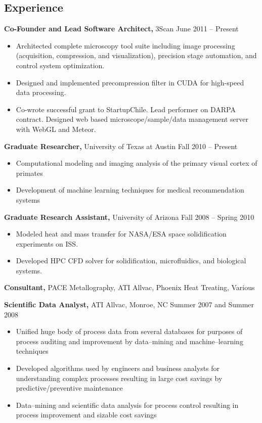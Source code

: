 \documentclass{res}
\begin{document}
\begin{resume}
\section{Experience}
{\bf Co-Founder and Lead Software Architect,} 3Scan \hfill 
June 2011 -- Present
\begin{itemize}  \itemsep -2pt 
\item Architected complete microscopy tool suite including image processing 
  (acquisition, compression, and visualization), 
  precision stage automation, and control system optimization.
\item Designed and implemented precompression filter in CUDA for high-speed data processing. 
\item Co-wrote successful grant to StartupChile.  Lead performer on
  DARPA contract.   Designed web based microscope/sample/data management server with WebGL and Meteor.
\end{itemize}

{\bf Graduate Researcher,} University of Texas at Austin \hfill 
Fall 2010 -- Present
\begin{itemize} \itemsep -2pt 
\item Computational modeling and imaging analysis of the primary visual cortex of primates
\item Development of machine learning techniques for medical recommendation systems
\end{itemize}
{\bf Graduate Research Assistant,} University of Arizona \hfill
Fall 2008 -- Spring 2010
\begin{itemize} \itemsep -2pt 
\item Modeled heat and mass transfer for NASA/ESA space solidification experiments on ISS.
\item Developed HPC CFD solver for solidification, microfluidics, and biological systems.
\end{itemize}

{\bf Consultant,} PACE Metallography, ATI Allvac, Phoenix Heat Treating, \hfill Various

{\bf Scientific Data Analyst,} ATI Allvac, Monroe, NC \hfill
Summer 2007 and Summer 2008
\begin{itemize} \itemsep -2pt 
\item Unified huge body of process data from several databases for purposes of 
  process auditing and improvement by data--mining and machine--learning techniques
\item Developed algorithms used by engineers and business analysts for understanding 
  complex processes resulting in large cost savings by predictive/preventive maintenance  
\item Data--mining and scientific data analysis for process control resulting
  in process improvement and sizable cost savings
\end{itemize}


\end{resume}
\end{document}
